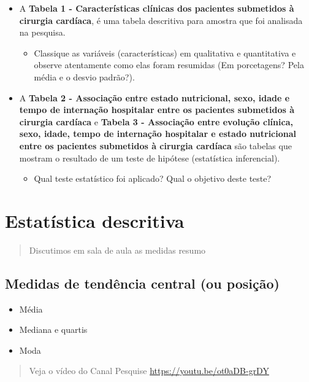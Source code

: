 \documentclass[
]{book}
\providecommand{\tightlist}{%
  \setlength{\itemsep}{0pt}\setlength{\parskip}{0pt}}
\begin{document}
\begin{itemize}
\item
  A \textbf{Tabela 1 - Características clínicas dos pacientes submetidos à cirurgia cardíaca}, é uma tabela descritiva para amostra que foi analisada na pesquisa.

  \begin{itemize}
  \tightlist
  \item
    Classique as variáveis (características) em qualitativa e quantitativa e observe atentamente como elas foram resumidas (Em porcetagens? Pela média e o desvio padrão?).
  \end{itemize}
\item
  A \textbf{Tabela 2 - Associação entre estado nutricional, sexo, idade e tempo de internação hospitalar entre os pacientes submetidos à cirurgia cardíaca} e \textbf{Tabela 3 - Associação entre evolução clínica, sexo, idade, tempo de internação hospitalar e estado nutricional entre os pacientes submetidos à cirurgia cardíaca} são tabelas que mostram o resultado de um teste de hipótese (estatística inferencial).

  \begin{itemize}
  \tightlist
  \item
    Qual teste estatístico foi aplicado? Qual o objetivo deste teste?
  \end{itemize}
\end{itemize}

\chapter{Estatística descritiva}\label{estatuxedstica-descritiva-1}

\begin{quote}
Discutimos em sala de aula as medidas resumo
\end{quote}

\section{Medidas de tendência central (ou posição)}\label{medidas-de-tenduxeancia-central-ou-posiuxe7uxe3o}

\begin{itemize}
\item
  Média
\item
  Mediana e quartis
\item
  Moda
\end{itemize}

\begin{quote}
Veja o vídeo do Canal Pesquise \url{https://youtu.be/ot0aDB-grDY}
\end{quote}
\end{document}

